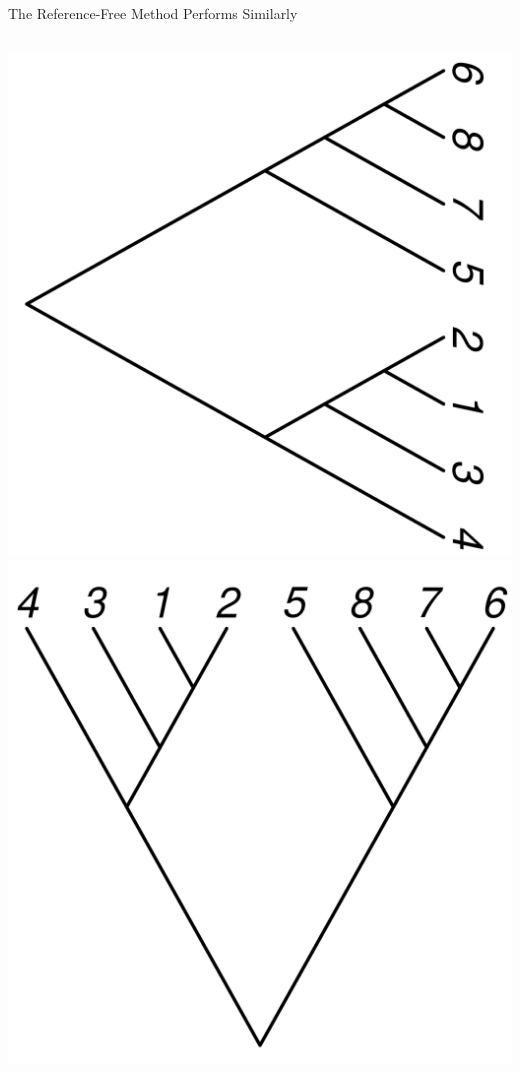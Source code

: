 \documentclass{beamer}
\begin{document}
\begin{frame}{The Reference-Free Method Performs Similarly}
	\begin{columns}
		\includegraphics[width=\linewidth]{disco_tree_rightwards.pdf}
		\includegraphics[width=\linewidth,angle=90]{true_tree.pdf}
	\end{columns}
\end{frame}
\end{document}
